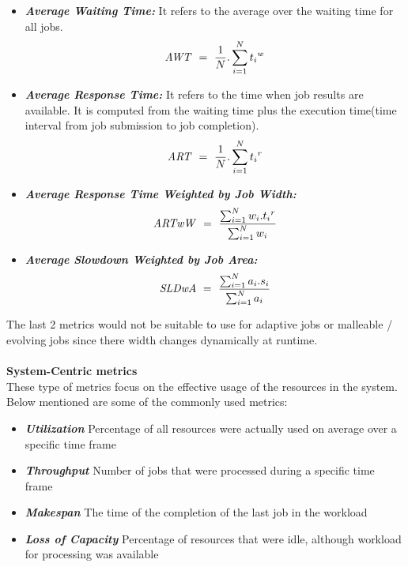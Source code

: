 \begin{itemize}
\item \textbf{\textit{Average Waiting Time:}} It refers to the average over the waiting time for all jobs.
\boldmath\begin{equation*}
\centering
\text{\textit{AWT}}\ =\ \frac{1}{N}.\sum_{i=1}^{N}{t_{i}}^{w}
\end{equation*}
\item \textbf{\textit{Average Response Time:}} It refers to the time when job results are available. It is computed from the waiting time plus the execution time(time interval from job submission to job completion).
\boldmath\begin{equation*}
\centering
\text{\textit{ART}}\ =\ \frac{1}{N}.\sum_{i=1}^{N}{t_{i}}^{r}
\end{equation*}
\item \textbf{\textit{Average Response Time Weighted by Job Width:}}
\boldmath\begin{equation*}
\centering
\text{\textit{ARTwW}}\ =\ \frac{\sum_{i=1}^{N}{w_{i}.t_{i}}^{r}}{\sum_{i=1}^{N}{w_{i}}}
\end{equation*}
\item \textbf{\textit{Average Slowdown Weighted by Job Area:}}
\boldmath\begin{equation*}
\centering
\text{\textit{SLDwA}}\ =\ \frac{\sum_{i=1}^{N}{a_{i}.s_{i}}}{\sum_{i=1}^{N}{a_{i}}}
\end{equation*}
\end{itemize}
The last 2 metrics would not be suitable to use for adaptive jobs or malleable / evolving jobs since there width changes dynamically at runtime.\\ \\
\textbf{System-Centric metrics\cite{streit}}\\
These type of metrics focus on the effective usage of the resources in the system. Below mentioned are some of the commonly used metrics:
\begin{itemize}
\item \textbf{\textit{Utilization}} Percentage of all resources were actually used on average over a specific time frame
\item \textbf{\textit{Throughput}} Number of jobs that were processed during a specific time frame
\item \textbf{\textit{Makespan}} The time of the completion of the last job in the workload
\item \textbf{\textit{Loss of Capacity}} Percentage of resources that were idle, although workload for processing was available
\end{itemize}
